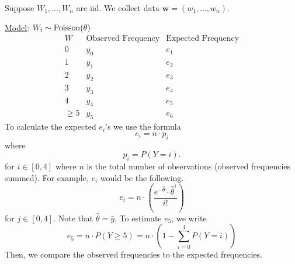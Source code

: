 \begin{exbox}
    \begin{example}
        Suppose $ W_1,\ldots ,W_n $ are iid. We collect data $ \bm{w}=(w_1,\ldots ,w_n) $.
        
        \underline{Model}: $ W_i \thicksim \operatorname{Poisson}(\theta) $
        \[
            \begin{array}{c|c|c|}
                W           & \text{Observed Frequency} & \text{Expected Frequency} \\
                \hline
                0           & y_0                       & e_1                       \\
                1           & y_1                       & e_2                       \\
                2           & y_2                       & e_3                       \\
                3           & y_3                       & e_4                       \\
                4           & y_4                       & e_5                       \\
                \geqslant 5 & y_5                       & e_6
            \end{array}
        \]
        To calculate the expected $ e_i $'s we use the formula
        \[ e_i=n\cdot p_i \]
        where
        \[ p_i=P(Y=i). \]
        for $ i\in[0,4] $ where $ n $ is the total number of observations (observed frequencies summed).
        For example, $ e_i $ would be the following.
        \[ e_i=n\cdot \left( \frac{e^{-\hat{\theta}}\cdot\hat{\theta}^{i}}{i!} \right) \]
        for $ j\in[0,4] $. Note that $ \hat{\theta}=\bar{y} $.
        To estimate $ e_5 $, we write
        \[ e_5=n\cdot P(Y\geqslant 5)=n\cdot \left( 1-\sum\limits_{i=0}^{4}P(Y=i) \right) \]
        Then, we compare the observed frequencies to the expected frequencies.
    \end{example}
\end{exbox}
